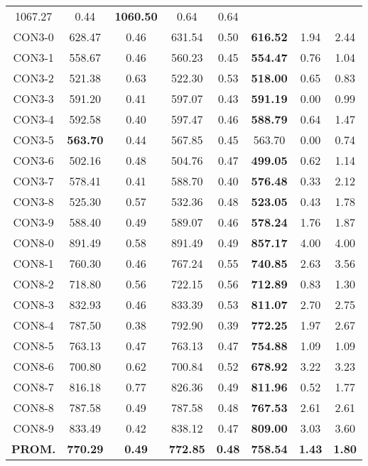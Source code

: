 \begin{table}[ht]
\begin{tabular}{c c c c c c c c}
1067.27 & 0.44 & \bf{1060.50} & 
0.64 & 0.64\\CON3-0 & 628.47 & 0.46 & 
631.54 & 0.50 & \bf{616.52} & 
1.94 & 2.44\\CON3-1 & 558.67 & 0.46 & 
560.23 & 0.45 & \bf{554.47} & 
0.76 & 1.04\\CON3-2 & 521.38 & 0.63 & 
522.30 & 0.53 & \bf{518.00} & 
0.65 & 0.83\\CON3-3 & 591.20 & 0.41 & 
597.07 & 0.43 & \bf{591.19} & 
0.00 & 0.99\\CON3-4 & 592.58 & 0.40 & 
597.47 & 0.46 & \bf{588.79} & 
0.64 & 1.47\\CON3-5 & \bf{563.70} & 0.44 & 
567.85 & 0.45 & 563.70 & 0.00
 & 0.74\\CON3-6 & 502.16 & 0.48 & 
504.76 & 0.47 & \bf{499.05} & 
0.62 & 1.14\\CON3-7 & 578.41 & 0.41 & 
588.70 & 0.40 & \bf{576.48} & 
0.33 & 2.12\\CON3-8 & 525.30 & 0.57 & 
532.36 & 0.48 & \bf{523.05} & 
0.43 & 1.78\\CON3-9 & 588.40 & 0.49 & 
589.07 & 0.46 & \bf{578.24} & 
1.76 & 1.87\\CON8-0 & 891.49 & 0.58 & 
891.49 & 0.49 & \bf{857.17} & 
4.00 & 4.00\\CON8-1 & 760.30 & 0.46 & 
767.24 & 0.55 & \bf{740.85} & 
2.63 & 3.56\\CON8-2 & 718.80 & 0.56 & 
722.15 & 0.56 & \bf{712.89} & 
0.83 & 1.30\\CON8-3 & 832.93 & 0.46 & 
833.39 & 0.53 & \bf{811.07} & 
2.70 & 2.75\\CON8-4 & 787.50 & 0.38 & 
792.90 & 0.39 & \bf{772.25} & 
1.97 & 2.67\\CON8-5 & 763.13 & 0.47 & 
763.13 & 0.47 & \bf{754.88} & 
1.09 & 1.09\\CON8-6 & 700.80 & 0.62 & 
700.84 & 0.52 & \bf{678.92} & 
3.22 & 3.23\\CON8-7 & 816.18 & 0.77 & 
826.36 & 0.49 & \bf{811.96} & 
0.52 & 1.77\\CON8-8 & 787.58 & 0.49 & 
787.58 & 0.48 & \bf{767.53} & 
2.61 & 2.61\\CON8-9 & 833.49 & 0.42 & 
838.12 & 0.47 & \bf{809.00} & 
3.03 & 3.60\\\bf{PROM.} & 
\bf{770.29} & \bf{0.49} & \bf{772.85} & \bf{0.48} & \bf{758.54} & \bf{1.43} & \bf{1.80}\\[1ex]\hline
\end{tabular}
\label{table:nonlin}
\end{table}

